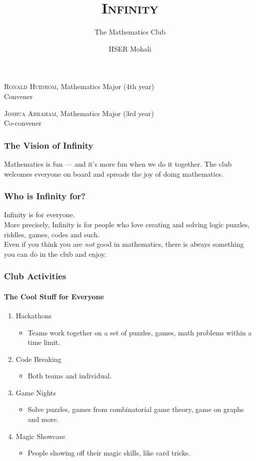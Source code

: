 \documentclass[10pt, aspectratio=43,leqno]{beamer}
\title{\textsc{Infinity}}
\subtitle{The Mathematics Club}
\author{IISER Mohali}
\begin{document}
\begin{frame}
  \titlepage
\end{frame}

\begin{frame}
  \textsc{Ronald Huidrom}, Mathematics Major (4th year) \\
  {\color{blue} Convener} \\
  \vspace*{.5cm}
  
  \textsc{Joshua Abraham}, Mathematics Major (3rd year) \\
  {\color{blue} Co-convener} \\
\end{frame}

\begin{frame}
  \frametitle{The Vision of Infinity}
  Mathematics is fun --- and it's more fun when we do it together. The club welcomes everyone on board and spreads the joy of doing mathematics. \\
\end{frame}

\begin{frame}
  \frametitle{Who is Infinity for?}
  \pause
  Infinity is for everyone. \pause \\
  \vspace*{.5cm}
  More precisely, Infinity is for people who love creating and solving logic puzzles, riddles, games, codes and such. \pause\\
  \vspace*{.5cm}
  Even if you think you are \emph{not} good in mathematics, there is always something you can do in the club and enjoy.
\end{frame}

\begin{frame}
  \frametitle{Club Activities}
  \framesubtitle{The Cool Stuff for Everyone}
  \pause
\begin{enumerate}
\item\label{item:1} Hackathons 
\begin{itemize}
\item\label{item:2} Teams work together on a set of puzzles, games, math problems within a time limit.
\end{itemize}
\pause
\item\label{item:3} Code Breaking 
\begin{itemize}
\item Both teams and individual.
\end{itemize}
\pause
\item\label{item:4} Game Nights 
\begin{itemize}
\item Solve puzzles, games from combinatorial game theory, game on graphs and more.
\end{itemize}
\pause 
\item\label{item:5} Magic Showcase 
\begin{itemize}
\item People showing off their magic skills, like card tricks.
\end{itemize}
\end{enumerate}
\end{frame}
\end{document}
